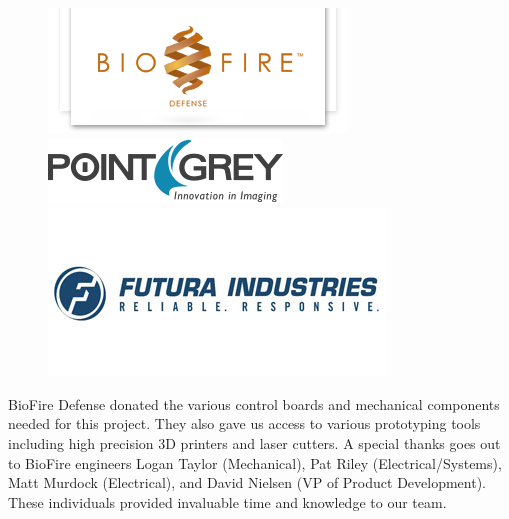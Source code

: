 \documentclass[final, letterpaper, 10 pt, conference, onecolumn]{IEEEtran}
\begin{document}
\begin{figure}[!htb]
  \includegraphics[width=\linewidth]{biofire_logo.png}
  \label{fig:biofire_logo}
\endminipage\hfill
{}
  \includegraphics[width=\linewidth]{point_grey.png}
  \label{fig:point_grey}
\endminipage\hfill
{}%
  \includegraphics[width=\linewidth]{futura_indust.jpg}
  \label{fig:futura_indst}
\endminipage
\label{fig:project_sponsors}
\end{figure}

BioFire Defense donated the various control boards and mechanical components needed for this project. They also gave us access to various prototyping tools including high precision 3D printers and laser cutters. A special thanks goes out to BioFire engineers Logan Taylor (Mechanical), Pat Riley (Electrical/Systems), Matt Murdock (Electrical), and David Nielsen (VP of Product Development). These individuals provided invaluable time and knowledge to our team.
\end{document}
